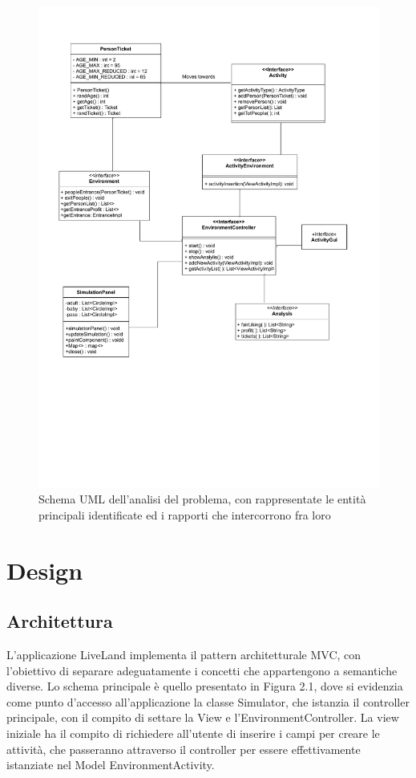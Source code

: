 \documentclass[a4paper,12pt]{report}
\begin{document}
\begin{figure}[H]
\includegraphics[width=.95\textwidth]{img/analysis.pdf}
\caption{Schema UML dell'analisi del problema, con rappresentate le entità principali identificate ed i rapporti che intercorrono fra loro}
\label{img:analysis}
\end{figure}

\chapter{Design}

\section{Architettura}

L'applicazione LiveLand implementa il pattern architetturale MVC, con l'obiettivo di separare adeguatamente i concetti che appartengono a semantiche diverse. Lo schema principale è quello presentato in Figura 2.1, dove si evidenzia come punto d'accesso all'applicazione la classe Simulator, che istanzia il controller principale, con il compito di settare la View e l'EnvironmentController. La view iniziale ha il compito di richiedere all'utente di inserire i campi per creare le attività, che passeranno attraverso il controller per essere effettivamente istanziate nel Model EnvironmentActivity.\\
\end{document}
